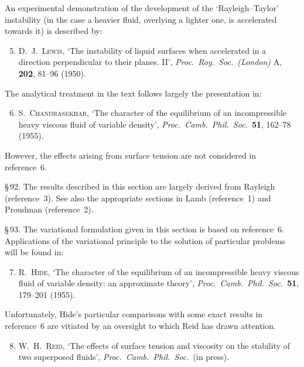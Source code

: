 An experimental demonstration of the development of the `Rayleigh--Taylor' instability (in the case a heavier fluid, overlying a lighter one, is accelerated towards it) is described by:

\begin{enumerate}
\setcounter{enumi}{4}
\item \textsc{D.\ J.\ Lewis}, `The instability of liquid surfaces when accelerated in a direction perpendicular to their planes. II', \textit{Proc.\ Roy.\ Soc.\ (London)} A, \textbf{202}, 81--96 (1950).
\end{enumerate}

The analytical treatment in the text follows largely the presentation in:

\begin{enumerate}
\setcounter{enumi}{5}
\item \textsc{S.\ Chandrasekhar}, `The character of the equilibrium of an incompressible heavy viscous fluid of variable density', \textit{Proc.\ Camb.\ Phil.\ Soc.}\ \textbf{51}, 162--78 (1955).
\end{enumerate}

However, the effects arising from surface tension are not considered in reference~6.

\medskip
\noindent\S\,92. The results described in this section are largely derived from Rayleigh (reference~3). See also the appropriate sections in Lamb (reference~1) and Proudman (reference~2).

\medskip
\noindent\S\,93. The variational formulation given in this section is based on reference~6. Applications of the variational principle to the solution of particular problems will be found in:

\begin{enumerate}
\setcounter{enumi}{6}
\item \textsc{R.\ Hide}, `The character of the equilibrium of an incompressible heavy viscous fluid of variable density: an approximate theory', \textit{Proc.\ Camb.\ Phil.\ Soc.}\ \textbf{51}, 179--201 (1955).
\end{enumerate}

Unfortunately, Hide's particular comparisons with some exact results in reference~6 are vitiated by an oversight to which Reid has drawn attention.

\begin{enumerate}
\setcounter{enumi}{7}
\item \textsc{W.\ H.\ Reid}, `The effects of surface tension and viscosity on the stability of two superposed fluids', \textit{Proc.\ Camb.\ Phil.\ Soc.}\ (in press).
\end{enumerate}

